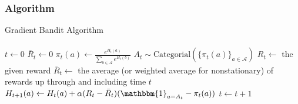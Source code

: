 \documentclass[../../main.tex]{subfiles}
\begin{document}
        \subsubsection{Algorithm}
            {Gradient Bandit Algorithm}
            {
                 \\
                 \\
            }
            {
            }
            {
                $t \leftarrow 0$\;
                $\bar{R}_t \leftarrow 0$\;
                {
                    {
                        $\pi_t(a) \leftarrow \frac{e^{H_t(a)}}{\sum_{b \in \mathcal{A}}e^{H_t(b)}}$\;
                    }
                    $A_t \sim \text{Categorial}(\{\pi_t(a)\}_{a \in \mathcal{A}})$\;
                    $R_t \leftarrow$ the given reward\;
                    $\bar{R}_t \leftarrow$ the average (or weighted average for nonstationary) of rewards up through and including time $t$\;
                    {
                        $H_{t+1}(a) \leftarrow H_t(a) + \alpha(R_t-\bar{R}_t)(\mathbbm{1}_{a = A_t} - \pi_t(a))$\;
                    }
                    $t \leftarrow t + 1$\;
                }
            }
\end{document}
